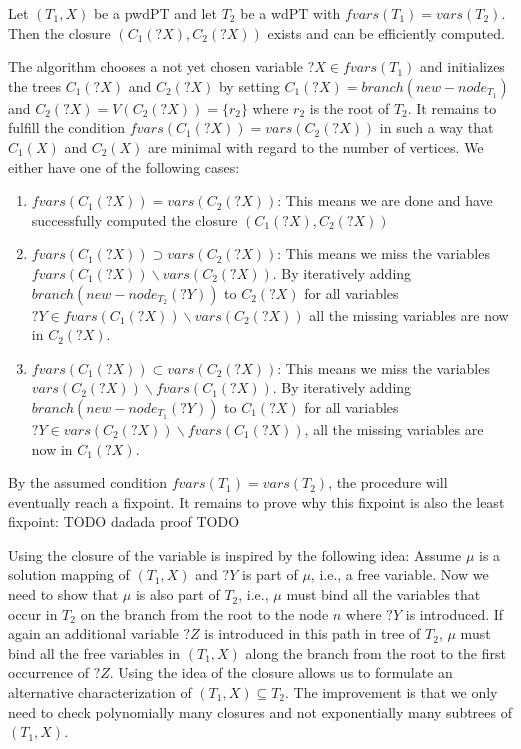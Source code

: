 \begin{proposition}
	Let $(T_1,X)$ be a pwdPT and let $T_2$ be a wdPT with $fvars(T_1) =
	vars(T_2)$. Then the closure $(C_1(?X),C_2(?X))$ exists and can be
	efficiently computed.
\end{proposition}
\begin{proofidea}
	The algorithm chooses a not yet chosen variable $?X \in fvars(T_1)$ and
	initializes the trees $C_1(?X)$ and $C_2(?X)$ by setting $C_1(?X) =
	branch(new-node_{T_1})$ and $C_2(?X) = V(C_2(?X)) = \{r_2\}$ where $r_2$ is
	the root of $T_2$. It remains to fulfill the condition $fvars(C_1(?X)) =
	vars(C_2(?X))$ in such a way that $C_1(X)$ and $C_2(X)$ are minimal with
	regard to the number of vertices. We either have one of the following cases:
	\begin{enumerate}
		\item $fvars(C_1(?X)) = vars(C_2(?X))$: This means we are done and have
			successfully computed the closure $(C_1(?X), C_2(?X))$
		\item $fvars(C_1(?X)) \supset vars(C_2(?X))$: This means we miss the
			variables $fvars(C_1(?X)) \backslash vars(C_2(?X))$. By
			iteratively adding $branch(new-node_{T_2}(?Y))$ to $C_2(?X)$ for all
			variables $?Y \in fvars(C_1(?X)) \backslash vars(C_2(?X))$ all
			the missing variables are now in $C_2(?X)$.
		\item $fvars(C_1(?X)) \subset vars(C_2(?X))$: This means we miss the
			variables $vars(C_2(?X)) \backslash fvars(C_1(?X))$. By iteratively
			adding $branch(new-node_{T_1}(?Y))$ to $C_1(?X)$ for all variables
			$?Y \in vars(C_2(?X)) \backslash fvars(C_1(?X))$, all the missing
			variables are now in $C_1(?X)$.
	\end{enumerate}
	By the assumed condition $fvars(T_1) = vars(T_2)$, the procedure will
	eventually reach a fixpoint.
	It remains to prove why this fixpoint is also the least fixpoint:
	TODO
	dadada proof
	TODO
\end{proofidea}

Using the closure of the variable is inspired by the following idea:
Assume $\mu$ is a solution mapping of $(T_1,X)$ and $?Y$ is part of $\mu$, i.e.,
a free variable. Now we need to show that $\mu$ is also part of $T_2$, i.e.,
$\mu$ must bind all the variables that occur in $T_2$ on the branch from the
root to the node $n$ where $?Y$ is introduced. If again an additional variable
$?Z$ is introduced in this path in tree of $T_2$, $\mu$ must bind all the free
variables in $(T_1,X)$ along the branch from the root to the first occurrence of
$?Z$. Using the idea of the closure allows us to formulate an alternative characterization of
$(T_1,X) \subseteq T_2$. The improvement is that we only need to check
polynomially many closures and not exponentially many subtrees of $(T_1,X)$.

